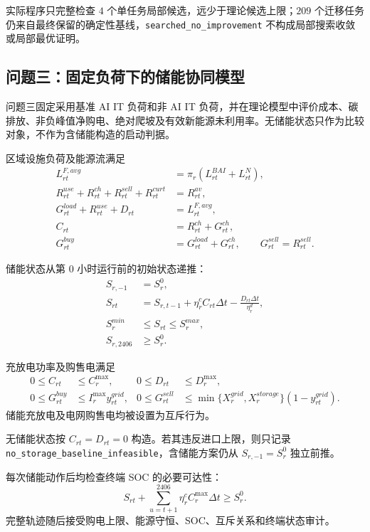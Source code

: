 实际程序只完整检查 $4$ 个单任务局部候选，远少于理论候选上限；$209$ 个迁移任务仍来自最终保留的确定性基线，\texttt{searched\_no\_improvement} 不构成局部搜索收敛或局部最优证明。

\subsection{问题三：固定负荷下的储能协同模型}

问题三固定采用基准 AI IT 负荷和非 AI IT 负荷，并在理论模型中评价成本、碳排放、非负峰值净购电、绝对爬坡及有效新能源未利用率。无储能状态只作为比较对象，不作为含储能构造的启动判据。

区域设施负荷及能源流满足
\begin{align}
L_{rt}^{F,avg}&=\pi_r(L_{rt}^{BAI}+L_{rt}^{N}),\\
R_{rt}^{use}+R_{rt}^{ch}+R_{rt}^{sell}+R_{rt}^{curt}&=R_{rt}^{av},\\
G_{rt}^{load}+R_{rt}^{use}+D_{rt}&=L_{rt}^{F,avg},\\
C_{rt}&=R_{rt}^{ch}+G_{rt}^{ch},\\
G_{rt}^{buy}&=G_{rt}^{load}+G_{rt}^{ch},\qquad
G_{rt}^{sell}=R_{rt}^{sell}.
\end{align}

储能状态从第 $0$ 小时运行前的初始状态递推：
\begin{align}
S_{r,-1}&=S_r^0,\\
S_{rt}&=S_{r,t-1}+\eta_r^cC_{rt}\Delta t
-\frac{D_{rt}\Delta t}{\eta_r^d},\\
S_r^{min}&\le S_{rt}\le S_r^{max},\\
S_{r,2406}&\ge S_r^0.
\end{align}

充放电功率及购售电满足
\begin{align}
0\le C_{rt}&\le C_r^{\max},&
0\le D_{rt}&\le D_r^{\max},\\
0\le G_{rt}^{buy}&\le I_r^{\max}y_{rt}^{grid},&
0\le G_{rt}^{sell}
&\le\min\{X_r^{grid},X_r^{storage}\}(1-y_{rt}^{grid}).
\end{align}
储能充放电及电网购售电均被设置为互斥行为。

无储能状态按 $C_{rt}=D_{rt}=0$ 构造。若其违反进口上限，则只记录 \texttt{no\_storage\_\allowbreak baseline\_\allowbreak infeasible}，含储能方案仍从 $S_{r,-1}=S_r^0$ 独立前推。

每次储能动作后均检查终端 SOC 的必要可达性：
\begin{equation}
S_{rt}+\sum_{u=t+1}^{2406}\eta_r^cC_r^{\max}\Delta t\ge S_r^0.
\end{equation}
完整轨迹随后接受购电上限、能源守恒、SOC、互斥关系和终端状态审计。

